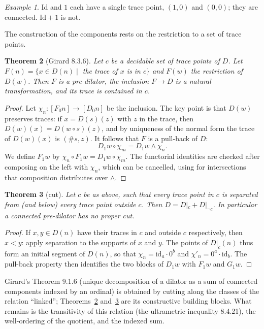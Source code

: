 \documentclass[11pt,a4paper]{article}
\newtheorem{theorem}{Theorem}[section]
\theoremstyle{definition}
\theoremstyle{remark}
\newtheorem{example}[theorem]{Example}
\newcommand{\id}{\mathrm{id}}
\begin{document}
\begin{example}
$\mathrm{Id}$ and $1$ each have a single trace point, $(1,0)$ and
$(0,0)$; they are connected. $\mathrm{Id} + 1$ is not.
\end{example}

The construction of the components rests on the restriction to a set of
trace points.

\begin{theorem}[Girard 8.3.6]\label{th:836}
Let $c$ be a decidable set of trace points of $D$. Let $F(n) = \{x \in
D(n) \mid$ the trace of $x$ is in $c\}$ and $F(w)$ the restriction of
$D(w)$. Then $F$ is a pre-dilator, the inclusion $F \to D$ is a natural
transformation, and its trace is contained in $c$.
\end{theorem}

\begin{proof}
Let $\chi_n : [F_0 n] \to [D_0 n]$ be the inclusion. The key point is that
$D(w)$ preserves traces: if $x = D(s)(z)$ with $z$ in the trace, then
$D(w)(x) = D(w \circ s)(z)$, and by uniqueness of the normal form the
trace of $D(w)(x)$ is $(\#s, z)$. It follows that $F$ is a pull-back of
$D$:
\[
D_1 w \circ \chi_m = D_1 w \wedge \chi_n .
\]
We define $F_1 w$ by $\chi_n \circ F_1 w = D_1 w \circ \chi_m$. The
functorial identities are checked after composing on the left with
$\chi_n$, which can be cancelled, using for intersections that
composition distributes over $\wedge$.
\end{proof}

\begin{theorem}[cut]\label{th:cut}
Let $c$ be as above, such that every trace point in $c$ is separated from
(and below) every trace point outside $c$. Then $D = D|_c + D|_{\neg c}$.
In particular a connected pre-dilator has no proper cut.
\end{theorem}

\begin{proof}
If $x, y \in D(n)$ have their traces in $c$ and outside $c$ respectively,
then $x < y$: apply separation to the supports of $x$ and $y$. The points
of $D|_c(n)$ thus form an initial segment of $D(n)$, so that $\chi_n =
\id_{a} \cdot 0^{b}$ and $\chi'_n = 0^{a} \cdot \id_{b}$. The pull-back
property then identifies the two blocks of $D_1 w$ with $F_1 w$ and
$G_1 w$.
\end{proof}

Girard's Theorem 9.1.6 (unique decomposition of a dilator as a sum of
connected components indexed by an ordinal) is obtained by cutting along
the classes of the relation ``linked''; Theorems~\ref{th:836}
and~\ref{th:cut} are its constructive building blocks. What remains is the
transitivity of this relation (the ultrametric inequality 8.4.21), the
well-ordering of the quotient, and the indexed sum.
\end{document}
